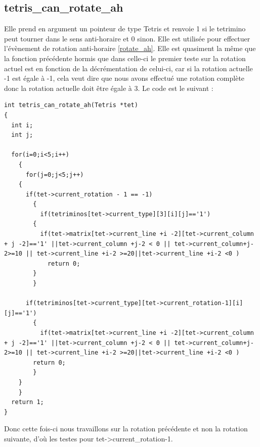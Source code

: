 \documentclass[a4paper,10p]{report}
\begin{document}
\subsection{tetris\_can\_rotate\_ah}
\label{tetris_can_rotate_ah}
Elle prend en argument un pointeur de type Tetris et renvoie 1 si le tetrimino peut tourner dans le sens anti-horaire et 0 sinon. Elle est utilisée pour effectuer l'évènement de rotation anti-horaire \ref{rotate_ah}. Elle est quasiment la même que la fonction précédente hormis que dans celle-ci le premier teste sur la rotation actuel est en fonction de la décrémentation de celui-ci, car si la rotation actuelle -1 est égale à -1, cela veut dire que nous avons effectué une rotation complète donc la rotation actuelle doit être égale à 3. Le code est le suivant :
\begin{lstlisting}
int tetris_can_rotate_ah(Tetris *tet)
{
  int i;
  int j;

  for(i=0;i<5;i++)
    {
      for(j=0;j<5;j++)
	{
	  if(tet->current_rotation - 1 == -1)
	    {
	      if(tetriminos[tet->current_type][3][i][j]=='1')
		{
		  if(tet->matrix[tet->current_line +i -2][tet->current_column + j -2]=='1' ||tet->current_column +j-2 < 0 || tet->current_column+j-2>=10 || tet->current_line +i-2 >=20||tet->current_line +i-2 <0 )
		    return 0;
		}
	    }
	      
	  if(tetriminos[tet->current_type][tet->current_rotation-1][i][j]=='1')
	    {
	      if(tet->matrix[tet->current_line +i -2][tet->current_column + j -2]=='1' ||tet->current_column +j-2 < 0 || tet->current_column+j-2>=10 || tet->current_line +i-2 >=20||tet->current_line +i-2 <0 )
		return 0;
	    }
	}
    }
  return 1;
}
\end{lstlisting}
Donc cette fois-ci nous travaillons sur la rotation précédente et non la rotation suivante, d'où les testes pour tet->current\_rotation-1.
\end{document}
